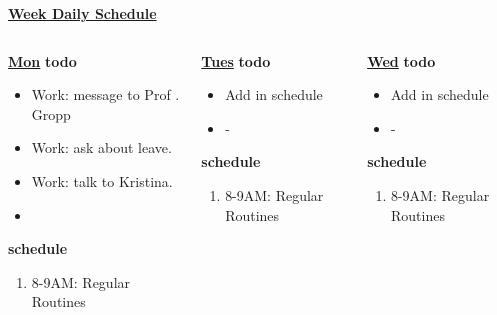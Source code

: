 \ifdefined\POSTER %
      \underline{\bf Week Daily Schedule}
        
        \begin{columns}
          \begin{column}{0.14\textwidth}{\small \underline{\bf Mon}}
            {\small \bf todo}\\ 
            \begin{itemize}
              \tiny \item \tiny Work: message to Prof . Gropp 
            \item \tiny Work: ask about leave. 
            \item \tiny Work: talk to Kristina. 
            \item \tiny 
            \end{itemize} 
                {\small  \bf schedule}\\
                \begin{enumerate} 
                  \tiny \item \tiny 8-9AM: Regular Routines 
                \end{enumerate}
          \end{column} 
          
          \begin{column}{0.14\textwidth}{\small \underline{\bf Tues}}
            {\small {\bf todo}}\\ 
            \begin{itemize}
              \tiny \item \tiny Add in schedule
            \item \tiny -
            \end{itemize} 
                {\small {\bf schedule}}
                \begin{enumerate} 
                  \tiny \item \tiny 8-9AM: Regular Routines 
                \end{enumerate} 
          \end{column}

          \begin{column}{0.14\textwidth}{\small \underline{\bf Wed}}
            \small{\bf todo}\\
            \begin{itemize}
              \tiny \item \tiny Add in schedule
            \item \tiny -
            \end{itemize} 
                {\small {\bf schedule}}\\
                \begin{enumerate} 
                  \tiny \item \tiny 8-9AM: Regular Routines 
                \end{enumerate} 
          \end{column}


\end{columns}
